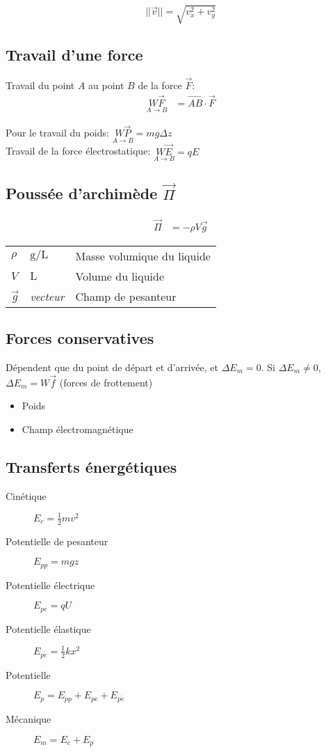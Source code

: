 \documentclass{article}
\newcommand{\vect}{\overrightarrow}
\newcommand{\deftable}[2]{%
\begin{table}[h]
    \centering
    \begin{tabular}{llp{100mm}}%
        #1
    \end{tabular}
    \label{tab:#2_units}
\end{table}%
}
\newcommand{\deftablevar}[3]{%
    $#1$ & $\si{#2}$ & #3 \\
}
\newcommand{\deftableobj}[3]{%
    $#1$ & \textit{#2} & #3 \\
}
\begin{document}
$$||\vec v|| = \sqrt{v_x^2 + v_y^2}$$

\subsection{Travail d'une force}

Travail du point $A$ au point $B$ de la force $\vec F$:
\begin{equation*}
    \begin{split}
        \underset{A\to B}{W\vec F} &= \vect{AB} \cdot \vec F
    \end{split}
\end{equation*}

Pour le travail du poids: $\underset{A\to B}{W\vec P} = mg\Delta z$\\
Travail de la force électrostatique: $\underset{A\to B}{W\vec E} = qE$

\subsection{Poussée d'archimède $\vec \Pi$}
\begin{equation*}
    \begin{split}
        \vec \Pi &= -\rho V \vec g
    \end{split}
\end{equation*}
\deftable{
    \deftablevar{\rho}{\gram\per\liter}{Masse volumique du liquide}
    \deftablevar{V}{\liter}{Volume du liquide}
    \deftableobj{\vec g}{vecteur}{Champ de pesanteur}
}{}

\subsection{Forces conservatives}

Dépendent que du point de départ et d'arrivée, et $\Delta E_m = 0$.
Si $\Delta E_m \not= 0$,  $\Delta E_m = W\vec f$ (forces de frottement)

\begin{itemize}
    \item Poids
    \item Champ électromagnétique
\end{itemize}

\subsection{Transferts énergétiques}

\begin{description}
    \item[Cinétique] $E_c = \frac{1}{2}mv^2$
    \item[Potentielle de pesanteur] $E_{pp} = mgz$
    \item[Potentielle électrique] $E_{pe} = qU$
    \item[Potentielle élastique]  $E_{p\acute e} = \frac{1}{2}kx^2$
    \item[Potentielle]  $E_p = E_{pp} + E_{pe} + E_{p\acute e}$
    \item[Mécanique] $E_m = E_c + E_p$
\end{description}
\end{document}
